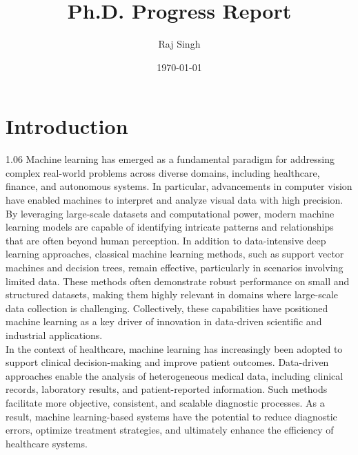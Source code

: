 \documentclass[12pt]{report}
\title{Ph.D. Progress Report}
\author{Raj Singh}
\date{\today}
\begin{document}
\maketitle

\tableofcontents
\newpage


\chapter{Introduction}

\begin{spacing}{1.06}
Machine learning has emerged as a fundamental paradigm for addressing complex real-world problems across diverse domains, including healthcare, finance, and autonomous systems. In particular, advancements in computer vision have enabled machines to interpret and analyze visual data with high precision. By leveraging large-scale datasets and computational power, modern machine learning models are capable of identifying intricate patterns and relationships that are often beyond human perception. In addition to data-intensive deep learning approaches, classical machine learning methods, such as support vector machines and decision trees, remain effective, particularly in scenarios involving limited data. These methods often demonstrate robust performance on small and structured datasets, making them highly relevant in domains where large-scale data collection is challenging. Collectively, these capabilities have positioned machine learning as a key driver of innovation in data-driven scientific and industrial applications.\\

In the context of healthcare, machine learning has increasingly been adopted to support clinical decision-making and improve patient outcomes. Data-driven approaches enable the analysis of heterogeneous medical data, including clinical records, laboratory results, and patient-reported information. Such methods facilitate more objective, consistent, and scalable diagnostic processes. As a result, machine learning-based systems have the potential to reduce diagnostic errors, optimize treatment strategies, and ultimately enhance the efficiency of healthcare systems.\\


\end{spacing}
\end{document}

